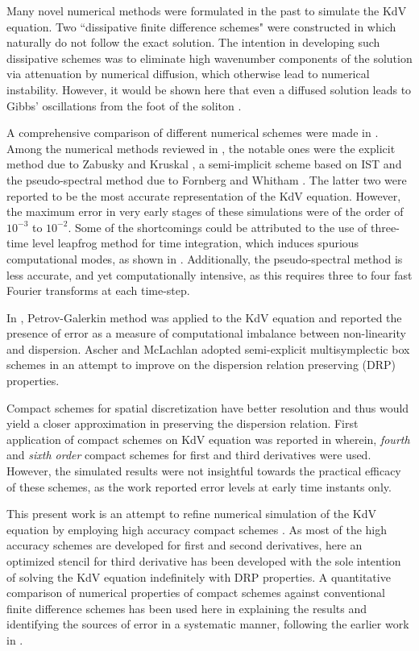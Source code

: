 \documentclass{svjour3}                    %
\begin{document}
Many novel numerical methods were formulated in the past to simulate the KdV equation. Two ``dissipative finite difference schemes" were constructed in \cite{Vliegenthart1971} which naturally do not follow the exact solution. The intention in developing such dissipative schemes was to eliminate high wavenumber components of the solution via attenuation by numerical diffusion, which otherwise lead to numerical instability. However, it would be shown 
here that even a diffused solution leads to Gibbs' oscillations from the foot of the soliton \cite{Sengupta2004a}.

A comprehensive comparison of different numerical schemes were made in \cite{Taha1984}. Among the numerical methods reviewed in \cite{Taha1984}, the notable ones were the explicit method due to Zabusky and Kruskal \cite{Zabusky1965}, a semi-implicit scheme based on IST and the pseudo-spectral method due to Fornberg and Whitham \cite{Fornberg1978}. The latter two were reported to be the most accurate representation of the KdV equation. However, the maximum error in very early stages of these simulations were of the order of $10^{-3}$ to $10^{-2}$. Some of the shortcomings 
could be attributed to the use of three-time level leapfrog method for time integration, which induces spurious computational modes, as shown in \cite{Sengupta2013a,Sengupta2004}. Additionally, the pseudo-spectral method is less accurate, and yet computationally intensive, as this requires three to 
four fast Fourier transforms at each time-step.

In \cite{Argyris1987}, Petrov-Galerkin method was applied to the KdV equation and reported the presence of error as a measure of computational imbalance between non-linearity and dispersion. Ascher and McLachlan \cite{Ascher2004} adopted semi-explicit multisymplectic box schemes in an attempt to improve on the dispersion relation preserving (DRP) properties.

Compact schemes for spatial discretization have better resolution and thus would yield a closer approximation in preserving the dispersion relation. First application of compact schemes on KdV equation was reported in \cite{Li2006} wherein, \emph{fourth} and \emph{sixth order} compact schemes for first and third derivatives were used. However, the simulated results were not insightful towards the practical efficacy of these schemes, as the work reported error levels at early time instants only.

This present work is an attempt to refine numerical simulation of the KdV equation by employing high accuracy compact schemes \cite{Sengupta2013a,Sengupta2006b}. As most of the high accuracy schemes are developed for first and second derivatives, here an optimized stencil for third derivative has been developed with the sole intention of solving the KdV equation indefinitely with DRP properties. A quantitative comparison of numerical properties of compact schemes against conventional finite difference schemes has been used here in explaining the results and identifying the sources of error in a systematic manner, following the earlier work in \cite{Sengupta2007}.
\end{document}
